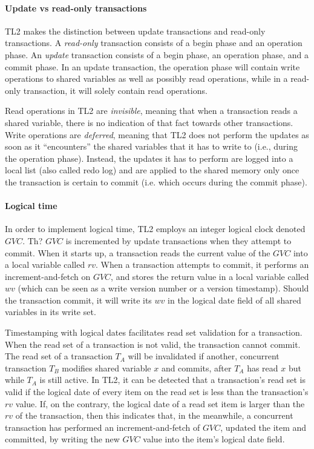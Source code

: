 \documentclass[11pt,letterpaper]{article}
\begin{document}
\paragraph{Update vs read-only transactions}
TL2  makes  the  distinction  between  update  transactions  and  read-only
transactions. A {\it read-only} 
transaction consists  of a  begin phase and  an operation phase.  
An {\it update}  transaction consists  
of a  begin phase,  an operation phase,  and a  commit phase. In  an update
transaction, the operation  
phase will contain write operations to shared variables as well as possibly
read operations, while  
in a  read-only transaction, it  will solely contain read  operations. 

Read
operations in TL2 are {\it invisible},  
meaning  that when  a  transaction reads  a  shared variable,  there is  no
indication of that fact towards  
other transactions.  Write operations are  {\it deferred}, 
meaning that  TL2 does not perform the updates  
as soon as  it {}``encounters'' the shared  variables that  it has to write
to (i.e., during the operation  
phase). Instead, the updates it has to perform are logged into a local list
(also called  redo log) and   are  applied  to the shared  memory only once
the transaction is certain  to commit (i.e. which occurs  during the
commit phase). 


\paragraph{Logical time}
In order to implement logical time, TL2 employs an integer logical 
clock denoted  
$\mathit{GVC}$. Th? $\mathit{GVC}$ is incremented by update 
transactions when they attempt to commit. When it starts up, 
a transaction reads the current value of 
the $\mathit{GVC}$ into a local variable called $\mathit{rv}$. When a 
transaction attempts to commit, it performs an increment-and-fetch on 
$\mathit{GVC}$, and stores the 
return value in a local variable called $\mathit{wv}$
(which can be seen as a write version number  or a version timestamp). 
Should the transaction commit, it will write its $\mathit{wv}$ in the 
logical date field 
of all shared variables in its write set. 

Timestamping with logical dates facilitates read set validation for a 
transaction. 
When the read set of a transaction is 
not valid,  the transaction  cannot commit. The  read set of  a transaction
$T_A$ will be  invalidated  
if another,  concurrent transaction $T_B$ modifies shared  variable $x$ and
commits, after $T_A$  
has read $x$  but while $T_A$ is  still active. In TL2, it  can be detected
that a transaction{}'s read  
set is valid if the logical date of every  item on the read set is less 
than the
transaction{}'s $\mathit{rv}$  value. If, on the  contrary, the logical 
date of a read set  item is larger than
the $\mathit{rv}$ of the transaction,  
then this  indicates that,  in the meanwhile,  a concurrent  transaction has
performed  an   increment-and-fetch    of   $\mathit{GVC}$,   updated   the
item  and  committed,  by  writing  the  new 
$\mathit{GVC}$ value into the item{}'s  logical date field.
\end{document}
